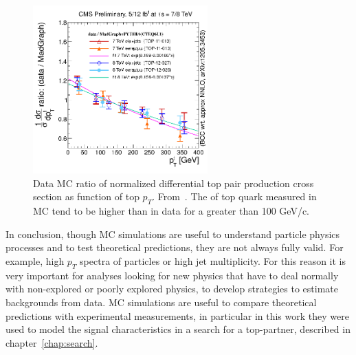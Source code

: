 \begin{figure}[!Hhtbp]
  \begin{center}
    \includegraphics[width=0.6\textwidth]{figs/topPtDataOverMadgraphPythia.png}
    \caption{Data MC ratio of normalized differential top pair production cross section as function of top $p_{T}$. From~\cite{Chatrchyan:2012saa,Chatrchyan:2013boa,Khachatryan:2015oqa}. The \pt of top quark measured in MC tend to be higher than in data for a \pt greater than 100 GeV/c.}
    \label{fig:TopPTReweighting}
  \end{center}
\end{figure}

In conclusion, though MC simulations are useful to understand particle physics processes and to test theoretical predictions, they are not always fully valid. For example, high $p_{T}$ spectra of particles or high jet multiplicity. For this reason it is very important for analyses looking for new physics that have to deal normally with non-explored or poorly explored physics, to develop strategies to estimate backgrounds from data. MC simulations are useful to compare theoretical predictions with experimental measurements, in particular in this work they were used to model the signal characteristics in a search for a top-partner, described in chapter~\ref{chap:search}. 